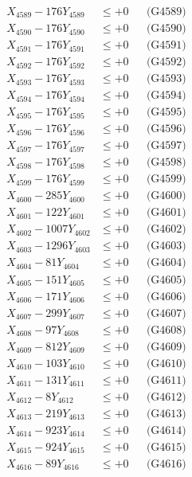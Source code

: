 \documentclass[a4paper,10pt]{article}
\begin{document}
{\begin{align}
X_{4589} - 176Y_{4589} &\leq +0 && \text{(G4589)} \\
X_{4590} - 176Y_{4590} &\leq +0 && \text{(G4590)} \\
\allowbreak
X_{4591} - 176Y_{4591} &\leq +0 && \text{(G4591)} \\
X_{4592} - 176Y_{4592} &\leq +0 && \text{(G4592)} \\
X_{4593} - 176Y_{4593} &\leq +0 && \text{(G4593)} \\
X_{4594} - 176Y_{4594} &\leq +0 && \text{(G4594)} \\
X_{4595} - 176Y_{4595} &\leq +0 && \text{(G4595)} \\
X_{4596} - 176Y_{4596} &\leq +0 && \text{(G4596)} \\
X_{4597} - 176Y_{4597} &\leq +0 && \text{(G4597)} \\
X_{4598} - 176Y_{4598} &\leq +0 && \text{(G4598)} \\
X_{4599} - 176Y_{4599} &\leq +0 && \text{(G4599)} \\
X_{4600} - 285Y_{4600} &\leq +0 && \text{(G4600)} \\
\allowbreak
X_{4601} - 122Y_{4601} &\leq +0 && \text{(G4601)} \\
X_{4602} - 1007Y_{4602} &\leq +0 && \text{(G4602)} \\
X_{4603} - 1296Y_{4603} &\leq +0 && \text{(G4603)} \\
X_{4604} - 81Y_{4604} &\leq +0 && \text{(G4604)} \\
X_{4605} - 151Y_{4605} &\leq +0 && \text{(G4605)} \\
X_{4606} - 171Y_{4606} &\leq +0 && \text{(G4606)} \\
X_{4607} - 299Y_{4607} &\leq +0 && \text{(G4607)} \\
X_{4608} - 97Y_{4608} &\leq +0 && \text{(G4608)} \\
X_{4609} - 812Y_{4609} &\leq +0 && \text{(G4609)} \\
X_{4610} - 103Y_{4610} &\leq +0 && \text{(G4610)} \\
\allowbreak
X_{4611} - 131Y_{4611} &\leq +0 && \text{(G4611)} \\
X_{4612} - 8Y_{4612} &\leq +0 && \text{(G4612)} \\
X_{4613} - 219Y_{4613} &\leq +0 && \text{(G4613)} \\
X_{4614} - 923Y_{4614} &\leq +0 && \text{(G4614)} \\
X_{4615} - 924Y_{4615} &\leq +0 && \text{(G4615)} \\
X_{4616} - 89Y_{4616} &\leq +0 && \text{(G4616)} \\

\end{align}}
\end{document}
